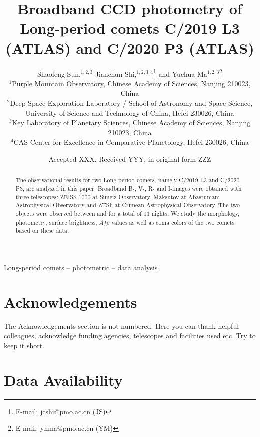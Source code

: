 \documentclass[fleqn,usenatbib]{mnras}
\title[Short title, max. 45 characters]{Broadband CCD photometry of Long-period comets C/2019 L3 (ATLAS) and C/2020 P3 (ATLAS)}
\author[Shaofeng Sun et al.]{
Shaofeng Sun,$^{1, 2, 3}$
Jianchun Shi,$^{1, 2, 3, 4}$\thanks{E-mail: jcshi@pmo.ac.cn (JS)}
and Yuehua Ma$^{1, 2, 3}$\thanks{E-mail: yhma@pmo.ac.cn (YM)}
\\
$^{1}$Purple Mountain Observatory, Chinese Academy of Sciences, Nanjing 210023, China\\
$^{2}$Deep Space Exploration Laboratory / School of Astronomy and Space Science, University of Science and Technology of China, Hefei 230026, China\\
$^{3}$Key Laboratory of Planetary Sciences, Chinese Academy of Sciences, Nanjing 210023, China\\
$^{4}$CAS Center for Excellence in Comparative Planetology, Hefei 230026, China
}
\date{Accepted XXX. Received YYY; in original form ZZZ}
\begin{document}
\label{firstpage}
\pagerange{\pageref{firstpage}--\pageref{lastpage}}
\maketitle


\begin{abstract}
	The observational results for two \ul{Long-period} comets, namely C/2019 L3 and C/2020 P3, are analyzed in this paper. 
	Broadband B-, V-, R- and I-images were obtained with three telescopes: ZEISS-1000 at Simeiz Observatory, Maksutov at Abastumani Astrophysical Observatory and ZTSh at Crimean Astrophysical Observatory. 
	The two objects were observed between  and  for a total of 13 nights. 
	We study the morphology, photometry, surface brightness, $Af\rho$ values as well as coma colors of the two comets based on these data. 
\end{abstract}

\begin{keywords}
Long-period comets -- photometric -- data analysis
\end{keywords}














\section*{Acknowledgements}

The Acknowledgements section is not numbered. Here you can thank helpful
colleagues, acknowledge funding agencies, telescopes and facilities used etc.
Try to keep it short.

\section*{Data Availability}
\end{document}
